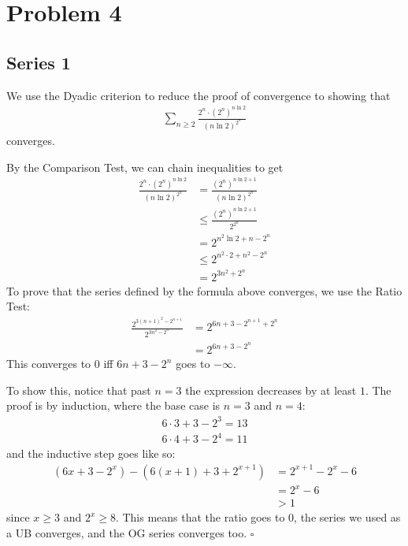 \documentclass[12pt]{article}
\begin{document}
\section{Problem 4}

\subsection{Series 1}

We use the Dyadic criterion to reduce the proof of convergence to showing that
\begin{align*}
  \sum_{n \ge 2} \frac{2^n \cdot \left(2^n\right)^{n \ln 2}}{(n \ln 2)^{2^n}}
\end{align*}
converges.

By the Comparison Test, we can chain inequalities to get
\begin{align*}
  \frac{2^n \cdot \left(2^n\right)^{n \ln 2}}{(n \ln 2)^{2^n}}
   & = \frac{\left(2^n\right)^{n \ln 2+1}}{(n \ln 2)^{2^n}} \\
   & \le \frac{\left(2^n\right)^{n \ln 2+1}}{2^{2^n}}       \\
   & = 2^{n^2\ln 2 + n - 2^n}                               \\
   & \le 2^{n^2 \cdot 2 + n^2 - 2^n}                        \\
   & = 2^{3n^2+2^n}
\end{align*}
To prove that the series defined by the formula above converges,
we use the Ratio Test:
\begin{align*}
  \frac{2^{3(n+1)^2-2^{n+1}}}{2^{3n^2-2^n}}
   & = 2^{6n+3-2^{n+1}+2^n} \\
   & = 2^{6n+3-2^n}
\end{align*}
This converges to $0$ iff $6n+3-2^n$ goes to $-\infty$.

To show this, notice that past $n=3$ the expression decreases by at least $1$.
The proof is by induction,
where the base case is $n=3$ and $n=4$:
\begin{gather*}
  6 \cdot 3 + 3 - 2^3 = 13 \\
  6 \cdot 4 + 3 - 2^4 = 11
\end{gather*}
and the inductive step goes like so:
\begin{align*}
  \left(6x+3-2^x\right) - \left(6(x+1)+3+2^{x+1}\right)
  &= 2^{x+1}-2^x - 6 \\
  &= 2^x - 6 \\
  &> 1
\end{align*}
since $x \ge 3$ and $2^x \ge 8$.
This means that the ratio goes to $0$, the series we used as a UB converges,
and the OG series converges too. $\square$
\end{document}
